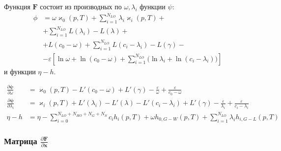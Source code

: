 \documentclass[12pt]{article}
\newcommand{\pd}[2]{\frac{\partial #1}{\partial #2}}
\begin{document}
Функция $\mathbf{F}$ состоит из производных по $\omega, \lambda_i$ функции
$\psi$:
\begin{align*}
\phi &= \omega \varkappa_0(p,T) + \sum_{i=1}^{N_{LO}} \lambda_i \varkappa_i(p,
T) +\\
&+ \sum_{i=1}^{N_{LO}} L(\lambda_i) - L(\lambda) + \\
&+ L(c_0 - \omega) + \sum_{i=1}^{N_{LO}} L(c_i - \lambda_i) 
- L(\gamma) - \\
&- \varepsilon \left[
\ln \omega + \ln (c_0 - \omega) + 
\sum_{i=1}^{N_{LO}} \Big( \ln \lambda_i
+ \ln (c_i - \lambda_i) \Big) 
\right]
\end{align*}
и функции $\eta - h$.

\begin{align*}
\pd{\mathbf{\psi}}{\omega} &= \varkappa_0(p, T) - L'(c_0 - \omega) + L'(\gamma) 
- \frac{\varepsilon}{\omega} + \frac{\varepsilon}{c_0 - \omega}\\
\pd{\mathbf{\psi}}{\lambda_i} &= \varkappa_i(p, T) + L'(\lambda_i) - L'(\lambda)
- L'(c_i - \lambda_i) + L'(\gamma) - \frac{\varepsilon}{\lambda_i}
+ \frac{\varepsilon}{c_i - \lambda_i}\\
\eta - h &= 
\eta - \sum_{i=0}^{N_{LO}+N_{HO}+N_{G}+N_{S}} c_i h_i(p,T)
+\omega h_{0,G-W}(p,T) 
+\sum_{i=1}^{N_{LO}} \lambda_i h_{i,G-L}(p,T)
\end{align*}

\subsubsection{Матрица $\pd{\mathbf{F}}{\mathbf{x}}$}
\end{document}
